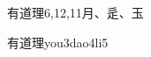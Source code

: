 \begin{entry}{有道理}{6,12,11}{⽉、⾡、⽟}
  \begin{phonetics}{有道理}{you3dao4li5}
  \end{phonetics}
\end{entry}
